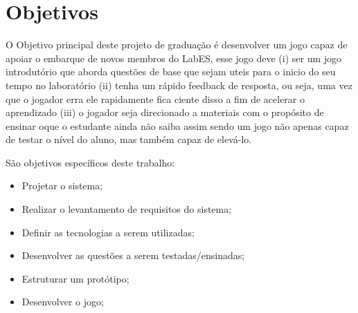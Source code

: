 \section{Objetivos}
\label{sec-intro-obj}




O Objetivo principal deste projeto de graduação é desenvolver um jogo capaz de apoiar o embarque de novos membros do LabES, esse jogo deve  (i) ser um jogo introdutório que aborda questões de base que sejam uteis para o inicio do seu tempo no laboratório (ii) tenha um rápido feedback de resposta, ou seja, uma vez que o jogador erra ele rapidamente fica ciente disso a fim de acelerar o aprendizado (iii) o jogador seja direcionado a materiais com o propósito de ensinar oque o estudante ainda não saiba assim sendo um jogo não apenas capaz de testar o nível do aluno, mas também capaz de elevá-lo.

    São objetivos específicos deste trabalho:
\begin{itemize}
    \item Projetar o sistema;
    \item Realizar o levantamento de requisitos do sistema;
    \item Definir as tecnologias a serem utilizadas;
    \item Desenvolver as questões a serem testadas/ensinadas;
    \item Estruturar um protótipo;
    \item Desenvolver o jogo;
\end{itemize}




